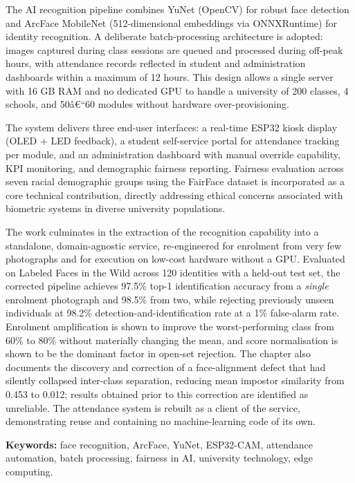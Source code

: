 \documentclass[12pt,a4paper]{report}
\begin{document}
The AI recognition pipeline combines YuNet (OpenCV) for robust face detection and ArcFace MobileNet (512-dimensional embeddings via ONNXRuntime) for identity recognition. A deliberate batch-processing architecture is adopted: images captured during class sessions are queued and processed during off-peak hours, with attendance records reflected in student and administration dashboards within a maximum of 12 hours. This design allows a single server with 16 GB RAM and no dedicated GPU to handle a university of 200 classes, 4 schools, and 50â€“60 modules without hardware over-provisioning.

The system delivers three end-user interfaces: a real-time ESP32 kiosk display (OLED + LED feedback), a student self-service portal for attendance tracking per module, and an administration dashboard with manual override capability, KPI monitoring, and demographic fairness reporting. Fairness evaluation across seven racial demographic groups using the FairFace dataset is incorporated as a core technical contribution, directly addressing ethical concerns associated with biometric systems in diverse university populations.

The work culminates in the extraction of the recognition capability into a
standalone, domain-agnostic service, re-engineered for enrolment from very few
photographs and for execution on low-cost hardware without a GPU. Evaluated on
Labeled Faces in the Wild across 120 identities with a held-out test set, the
corrected pipeline achieves 97.5\% top-1 identification accuracy from a
\emph{single} enrolment photograph and 98.5\% from two, while rejecting
previously unseen individuals at 98.2\% detection-and-identification rate at a
1\% false-alarm rate. Enrolment amplification is shown to improve the
worst-performing class from 60\% to 80\% without materially changing the mean,
and score normalisation is shown to be the dominant factor in open-set rejection.
The chapter also documents the discovery and correction of a face-alignment
defect that had silently collapsed inter-class separation, reducing mean impostor
similarity from 0.453 to 0.012; results obtained prior to this correction are
identified as unreliable. The attendance system is rebuilt as a client of the
service, demonstrating reuse and containing no machine-learning code of its own.

\textbf{Keywords:} face recognition, ArcFace, YuNet, ESP32-CAM, attendance automation, batch processing, fairness in AI, university technology, edge computing.
\end{document}
